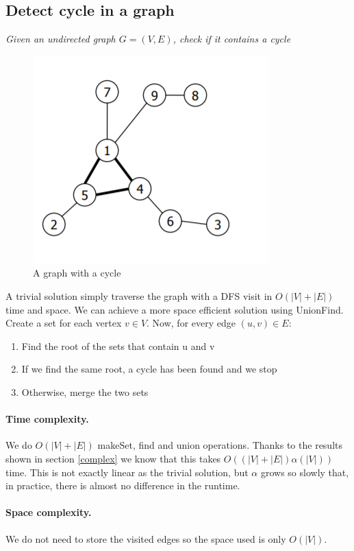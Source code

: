 \documentclass{article}
\begin{document}
\subsection{Detect cycle in a graph} \label{loop}
\emph{Given an undirected graph $G = (V, E)$, check if it contains a cycle}
\begin{figure}[h!]
    \centering
    \includegraphics[scale=0.5]{img/cycle.png}
    \caption{A graph with a cycle}
\end{figure}
\bigskip

A trivial solution simply traverse the graph with a DFS visit in $O(|V| + |E|)$
time and space. We can achieve a more space efficient solution using UnionFind. Create a set for each
vertex $v \in V$. Now, for every edge $ (u,v) \in E$:\begin{enumerate}
    \item Find the root  of the sets that contain u and v
    \item If we find  the same root, a cycle has been found and we stop 
    \item Otherwise, merge the two sets
\end{enumerate}

\paragraph{Time complexity.} We do $O(|V| + |E|)$ makeSet, find and union operations.
Thanks  to the results shown in section \ref{complex} we know that this takes $O((|V| + |E|)\alpha(|V|))$ time. 
This is not exactly linear as the trivial solution, but $\alpha$ grows so slowly that, in practice, there is almost no difference in the runtime.

\paragraph{Space complexity.} We do not need to store the visited edges so the space used is only $O(|V|)$.

\end{document}
